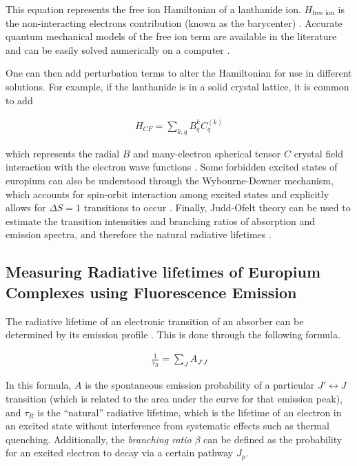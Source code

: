 This equation represents the free ion Hamiltonian of a lanthanide ion.
$H_{\text{free ion}}$ is the non-interacting electrons contribution (known as
the barycenter) \cite{Peijzel:2005jh}. Accurate quantum mechanical models of
the free ion term are available in the literature and can be easily solved
numerically on a computer \cite{Carnall:1989fc,Morrison:1988tw}.

One can then add perturbation terms to alter the Hamiltonian for use in
different solutions. For example, if the lanthanide is in a solid crystal
lattice, it is common to add

\begin{align*}
  H_{CF} = \sum_{k,q} B_q^k C_q^{(k)}
\end{align*}

which represents the radial $B$ and many-electron spherical tensor $C$ crystal
field interaction with the electron wave functions \cite{Peijzel:2005jh}.  Some
forbidden excited states of europium can also be understood through the
Wybourne-Downer mechanism, which accounts for spin-orbit interaction among
excited states and explicitly allows for $\Delta S = 1$ transitions to occur
\cite{Wybourne:1968ez,Downer:1988kz}.  Finally, Judd-Ofelt theory can be used
to estimate the transition intensities and branching ratios of absorption and
emission spectra, and therefore the natural radiative lifetimes
\cite{Werts:2002fs}.



\subsection{Measuring Radiative lifetimes of Europium Complexes using Fluorescence Emission}\label{subsec:rad_life}

The radiative lifetime of an electronic transition of an absorber can be
determined by its emission profile \cite{Werts:2002fs}. This is done through
the following formula.

\begin{align}
  \frac{1}{\tau_R} = \sum_JA_{J'J}\label{eq:nat_life_emiss}
\end{align}

In this formula, $A$ is the spontaneous emission probability of a particular
$J' \leftrightarrow J$ transition (which is related to the area under the curve for that
emission peak), and $\tau_R$ is the ``natural'' radiative lifetime, which
is the lifetime of an electron in an excited state without interference
from systematic effects such as thermal quenching. Additionally, the
\emph{branching ratio} $\beta$ can be defined as the probability for an
excited electron to decay via a certain pathway $J_p$.

